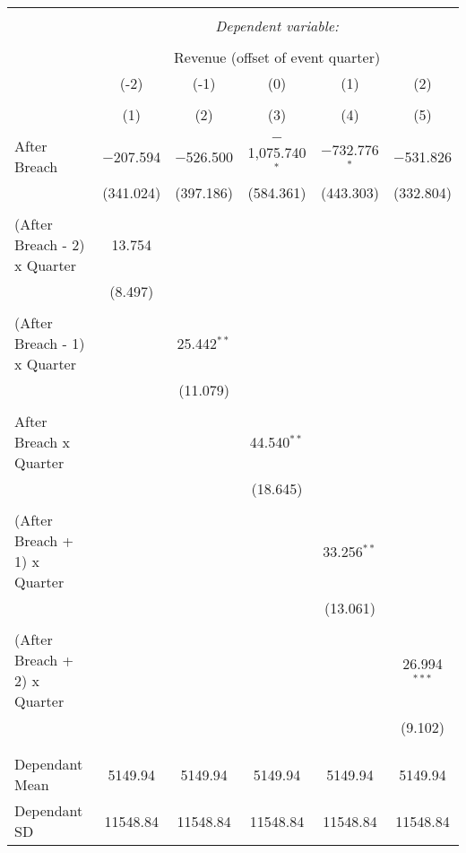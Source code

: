 
\begin{table}[!htbp] \centering 
  \caption{} 
  \label{} 
\begin{tabular}{@{\extracolsep{5pt}}lccccc} 
\\[-1.8ex]\hline 
\hline \\[-1.8ex] 
 & \multicolumn{5}{c}{\textit{Dependent variable:}} \\ 
\cline{2-6} 
\\[-1.8ex] & \multicolumn{5}{c}{Revenue (offset of event quarter)} \\ 
 & (-2) & (-1) & (0) & (1) & (2) \\ 
\\[-1.8ex] & (1) & (2) & (3) & (4) & (5)\\ 
\hline \\[-1.8ex] 
 After Breach & $-$207.594 & $-$526.500 & $-$1,075.740$^{*}$ & $-$732.776$^{*}$ & $-$531.826 \\ 
  & (341.024) & (397.186) & (584.361) & (443.303) & (332.804) \\ 
  & & & & & \\ 
 (After Breach - 2) x Quarter & 13.754 &  &  &  &  \\ 
  & (8.497) &  &  &  &  \\ 
  & & & & & \\ 
 (After Breach - 1) x Quarter &  & 25.442$^{**}$ &  &  &  \\ 
  &  & (11.079) &  &  &  \\ 
  & & & & & \\ 
 After Breach x Quarter &  &  & 44.540$^{**}$ &  &  \\ 
  &  &  & (18.645) &  &  \\ 
  & & & & & \\ 
 (After Breach + 1) x Quarter &  &  &  & 33.256$^{**}$ &  \\ 
  &  &  &  & (13.061) &  \\ 
  & & & & & \\ 
 (After Breach + 2) x Quarter &  &  &  &  & 26.994$^{***}$ \\ 
  &  &  &  &  & (9.102) \\ 
  & & & & & \\ 
\hline \\[-1.8ex] 
Dependant Mean & 5149.94 & 5149.94 & 5149.94 & 5149.94 & 5149.94 \\ 
Dependant SD & 11548.84 & 11548.84 & 11548.84 & 11548.84 & 11548.84 \\ 

\end{tabular}
\end{table}
